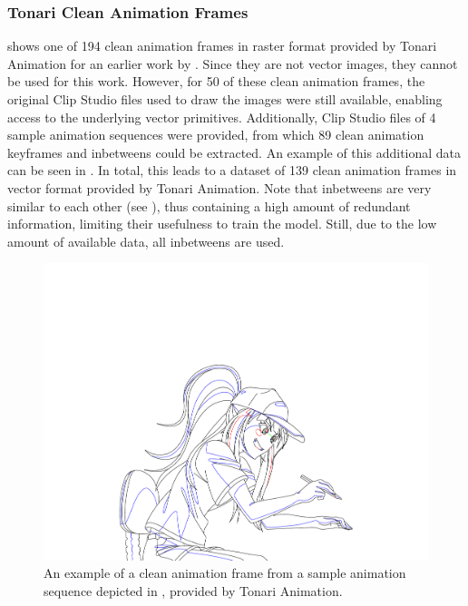 \subsubsection{Tonari Clean Animation Frames}
\label{subsec:dataset.douga}
 shows one of 194 clean animation frames in raster format provided by Tonari Animation for an earlier work by \citet{Kugler-2021}. Since they are not vector images, they cannot be used for this work. However, for 50 of these clean animation frames, the original Clip Studio \citep{clipstudio} files used to draw the images were still available, enabling access to the underlying vector primitives. Additionally, Clip Studio files of 4 sample animation sequences were provided, from which 89 clean animation keyframes and inbetweens could be extracted. An example of this additional data can be seen in . In total, this leads to a dataset of 139 clean animation frames in vector format provided by Tonari Animation. Note that inbetweens are very similar to each other (see ), thus containing a high amount of redundant information, limiting their usefulness to train the model. Still, due to the low amount of available data, all inbetweens are used.

\begin{figure}
    \centering
    \includegraphics[width=\textwidth]{graphics/douga/007AD_DOU_27.pdf}
    \caption{An example of a clean animation frame from a sample animation sequence depicted in , provided by Tonari Animation.}
    \label{fig:sample-animation-ex}
\end{figure}

